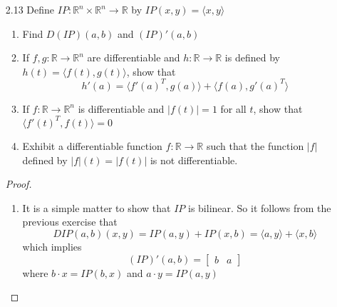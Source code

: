 \begin{enumerate}
\begin{proof}[Proof of Exercise]
\begin{enumerate}
        \vspace{1mm}
        
        which, by (a), will produce the result.
        
        \item It is a simple matter to show that \( p: \mathbb{R} \times \mathbb{R} \rightarrow \mathbb{R} \) defined by \( p(x,y) = x\cdot y \) is bilinear. Part (b) in the above implies then that 
        \[
        Dp(a,b) (x,y) = p(a,y) + p(x,b) = ay + bx = bx + ay
        \]
        as desired.
    \end{enumerate}
    \end{proof}
    
    \item[2.13] Define \( IP: \mathbb{R}^n \times \mathbb{R}^n \rightarrow \mathbb{R} \) by \( IP(x,y) = \langle x,y \rangle \)
    \begin{enumerate}
        \item Find \( D(IP)(a,b) \) and \( (IP)'(a,b) \)
        \item If \( f,g:\mathbb{R} \rightarrow \mathbb{R}^n \) are differentiable and \( h: \mathbb{R} \rightarrow \mathbb{R} \) is defined by \( h(t) = \langle f(t), g(t) \rangle \), show that 
        \[
        h'(a) = \langle f'(a)^T,g(a) \rangle + \langle f(a),g'(a)^T \rangle
        \]
        \item If \( f:\mathbb{R} \rightarrow \mathbb{R}^n\) is differentiable and \( \left| f(t) \right| = 1 \) for all \( t \), show that \( \langle f'(t)^T,f(t) \rangle = 0 \)
        \item Exhibit a differentiable function \( f:\mathbb{R} \rightarrow \mathbb{R} \) such that the function \( \left| f \right| \) defined by \( \left| f \right| (t)  = \left| f(t) \right| \) is not differentiable.
    \end{enumerate}
    \begin{proof}
    \begin{enumerate}
        \item It is a simple matter to show that \( IP \) is bilinear. So it follows from the previous exercise that
        \[
        DIP(a,b)(x,y) = IP(a,y) + IP(x,b) = \langle a,y \rangle + \langle x,b \rangle
        \]
        which implies
        \[
        (IP)'(a,b) = \left[ \begin{array}{cc} b & a \end{array} \right]
        \]
        where \( b \cdot x = IP (b,x) \) and \( a \cdot y = IP(a,y)\)
        

\end{enumerate}
\end{proof}
\end{enumerate}
